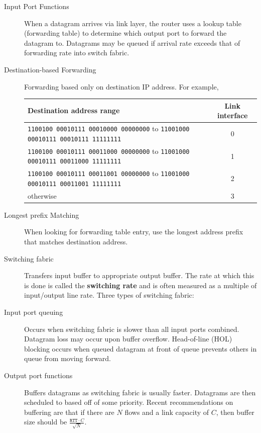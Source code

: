 \documentclass{article}
\begin{document}
\begin{description}
    \item[Input Port Functions] When a datagram arrives via link layer, the router uses a lookup
    table (forwarding table) to determine which output port to forward the datagram to. Datagrams may
    be queued if arrival rate exceeds that of forwarding rate into switch fabric.
    
    \item[Destination-based Forwarding] Forwarding based only on destination IP address. For example,
    \begin{center}
    \begin{tabular}{l|c}
        Destination address range & Link interface\\
        \hline
        \texttt{1100100 00010111 00010000 00000000} to \texttt{11001000 00010111 00010111 11111111} &  0\\
        \texttt{1100100 00010111 00011000 00000000} to \texttt{11001000 00010111 00011000 11111111} &  1\\
        \texttt{1100100 00010111 00011001 00000000} to \texttt{11001000 00010111 00011001 11111111} &  2\\
        otherwise & 3
    \end{tabular}
    \end{center}
    
    \item[Longest prefix Matching] When looking for forwarding table entry, use the longest address 
    prefix that matches destination address.
    
    \item[Switching fabric] Transfers input buffer to appropriate output buffer. The rate at which 
    this is done is called the \textbf{switching rate} and is often measured as a multiple of 
    input/output line rate. Three types of switching fabric:
    
    \item[Input port queuing] Occurs when switching fabric is slower than all input ports combined.
    Datagram loss may occur upon buffer overflow. Head-of-line (HOL) blocking occurs when queued 
    datagram at front of queue prevents others in queue from moving forward.
    
    \item[Output port functions] Buffers datagrams as switching fabric is usually faster. Datagrams
    are then scheduled to based off of some priority. Recent recommendations on buffering are that
    if there are $N$ flows and a link capacity of $C$, then buffer size should be
    $\frac{\texttt{RTT}\cdot C}{\sqrt N}.$
    

\end{description}
\end{document}
